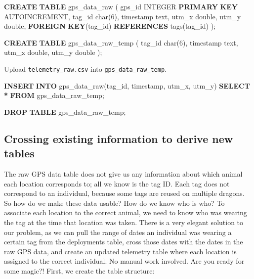 \documentclass[
]{book}
\newenvironment{Shaded}{\begin{snugshade}}{\end{snugshade}}
\newcommand{\DataTypeTok}[1]{\textcolor[rgb]{0.13,0.29,0.53}{#1}}
\newcommand{\DecValTok}[1]{\textcolor[rgb]{0.00,0.00,0.81}{#1}}
\newcommand{\KeywordTok}[1]{\textcolor[rgb]{0.13,0.29,0.53}{\textbf{#1}}}
\newcommand{\NormalTok}[1]{#1}
\newcommand{\OperatorTok}[1]{\textcolor[rgb]{0.81,0.36,0.00}{\textbf{#1}}}
\begin{document}
\begin{Shaded}
\begin{Highlighting}[]
\KeywordTok{CREATE} \KeywordTok{TABLE}\NormalTok{ gps\_data\_raw (}
\NormalTok{gps\_id }\DataTypeTok{INTEGER} \KeywordTok{PRIMARY} \KeywordTok{KEY}\NormalTok{ AUTOINCREMENT,}
\NormalTok{tag\_id }\DataTypeTok{char}\NormalTok{(}\DecValTok{6}\NormalTok{),}
\DataTypeTok{timestamp}\NormalTok{ text, }
\NormalTok{utm\_x }\DataTypeTok{double}\NormalTok{,}
\NormalTok{utm\_y }\DataTypeTok{double}\NormalTok{,}
\KeywordTok{FOREIGN} \KeywordTok{KEY}\NormalTok{(tag\_id) }\KeywordTok{REFERENCES}\NormalTok{ tags(tag\_id)}
\NormalTok{);}

\KeywordTok{CREATE} \KeywordTok{TABLE}\NormalTok{ gps\_data\_raw\_temp (}
\NormalTok{tag\_id }\DataTypeTok{char}\NormalTok{(}\DecValTok{6}\NormalTok{),}
\DataTypeTok{timestamp}\NormalTok{ text, }
\NormalTok{utm\_x }\DataTypeTok{double}\NormalTok{,}
\NormalTok{utm\_y }\DataTypeTok{double}
\NormalTok{);}
\end{Highlighting}
\end{Shaded}

Upload \texttt{telemetry\_raw.csv} into \texttt{gps\_data\_raw\_temp}.

\begin{Shaded}
\begin{Highlighting}[]
\KeywordTok{INSERT} \KeywordTok{INTO}\NormalTok{ gps\_data\_raw(tag\_id, }\DataTypeTok{timestamp}\NormalTok{, utm\_x, utm\_y) }
\KeywordTok{SELECT} \OperatorTok{*} \KeywordTok{FROM}\NormalTok{ gps\_data\_raw\_temp;}

\KeywordTok{DROP} \KeywordTok{TABLE}\NormalTok{ gps\_data\_raw\_temp;}
\end{Highlighting}
\end{Shaded}

\hypertarget{crossing-existing-information-to-derive-new-tables}{%
\subsection{Crossing existing information to derive new tables}\label{crossing-existing-information-to-derive-new-tables}}

The raw GPS data table does not give us any information about which animal each
location corresponds to; all we know is the tag ID. Each tag does not correspond
to an individual, because some tags are reused on multiple dragons. So how do
we make these data usable? How do we know who is who? To associate each location
to the correct animal, we need to know who was wearing the tag at the time that
location was taken. There is a very elegant solution to our problem, as we can
pull the range of dates an individual was wearing a certain tag from the
deployments table, cross those dates with the dates in the raw GPS data, and
create an updated telemetry table where each location is assigned to the correct
individual. No manual work involved. Are you ready for some magic?! First, we
create the table structure:
\end{document}

